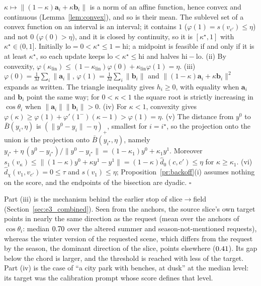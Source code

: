 \documentclass{article}
\theoremstyle{plain}
\theoremstyle{remark}
\begin{document}
$\kappa\mapsto\|(1-\kappa)\mathbf a_i+\kappa\mathbf b_i\|$ is a norm of an affine function, hence convex and continuous
(Lemma~\ref{lem:convex}), and so is their mean. The sublevel set of a convex function on an interval is an interval; it contains $1$
($\varphi(1)=s(v_{c'})\le\eta$) and not $0$ ($\varphi(0)>\eta$), and it is closed by continuity, so it is $[\kappa^\star,1]$ with
$\kappa^\star\in(0,1]$. Initially $\mathrm{lo}=0<\kappa^\star\le1=\mathrm{hi}$; a midpoint is feasible if and only if it is at least
$\kappa^\star$, so each update keeps $\mathrm{lo}<\kappa^\star\le\mathrm{hi}$ and halves $\mathrm{hi}-\mathrm{lo}$.
(ii) By convexity, $\varphi(\kappa_{\mathrm{lin}})\le(1-\kappa_{\mathrm{lin}})\varphi(0)+\kappa_{\mathrm{lin}}\varphi(1)=\eta$.
(iii) $\varphi(0)=\frac1M\sum_i\|\mathbf a_i\|$, $\varphi(1)=\frac1M\sum_i\|\mathbf b_i\|$ and
$\|(1-\kappa)\mathbf a_i+\kappa\mathbf b_i\|^2$ expands as written. The triangle inequality gives $h_i\ge0$, with equality when $\mathbf a_i$ and
$\mathbf b_i$ point the same way; for $0<\kappa<1$ the square root is strictly increasing in $\cos\theta_i$ when $\|\mathbf a_i\|\|\mathbf b_i\|>0$.
(iv) For $\kappa<1$, convexity gives $\varphi(\kappa)\ge\varphi(1)+\varphi'(1^-)(\kappa-1)>\varphi(1)=\eta$.
(v) The distance from $y^0$ to $\bar B(y_i,\eta)$ is $(\|y^0-y_i\|-\eta)_+$, smallest for $i=i^\star$, so the projection onto the union
is the projection onto $\bar B(y_{i^\star},\eta)$, namely $y_{i^\star}+\eta\,(y^0-y_{i^\star})/\|y^0-y_{i^\star}\|=(1-\kappa_1)y^0+\kappa_1y^1$.
Moreover $s_1(v_\kappa)\le\|(1-\kappa)y^0+\kappa y^1-y^1\|=(1-\kappa)\hat d_0(c,c')\le\eta$ for $\kappa\ge\kappa_1$.
(vi) $\hat d_\chi(v_1,v_{c'})=0\le\tau$ and $s(v_1)\le\eta$; Proposition~\ref{pr:backoff}(i) assumes nothing on the score, and the
endpoints of the bisection are dyadic. \hfill$\square$

Part (iii) is the mechanism behind the earlier stop of slice$\to$field (Section~\ref{sec:e3_combined}). Seen from the anchors, the
source slice's own target points in nearly the same direction as the request (mean over the anchors of $\cos\theta_i$: median
$0.70$ over the altered summer and season-not-mentioned requests), whereas the winter version of the requested scene, which differs
from the request by the season, the dominant direction of the slice, points elsewhere ($0.41$). Its gap below the chord is
larger, and the threshold is reached with less of the target. Part (iv) is the case of ``a city park with benches, at dusk'' at the
median level: its target was the calibration prompt whose score defines that level.
\end{document}
